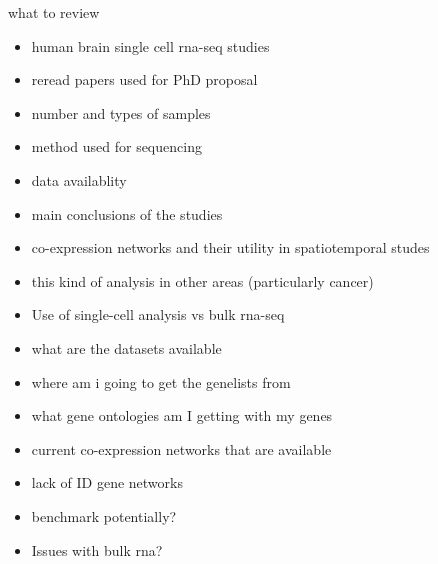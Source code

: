 \documentclass[12pt]{article}
\begin{document}
what to review

\begin{itemize}
	\item human brain single cell rna-seq studies 
	\item reread papers used for PhD proposal 
	\item number and types of samples 
	\item method used for sequencing 
	\item data availablity 
	\item main conclusions of the studies
	\item co-expression networks and their utility in spatiotemporal studes 
	\item this kind of analysis in other areas (particularly cancer)
	\item Use of single-cell analysis vs bulk rna-seq 
\end{itemize}


\begin{itemize}
	
	\item what are the datasets available 
	\item where am i going to get the genelists from 
	\item what gene ontologies am I getting with my genes 
	\item current co-expression networks that are available
	\item lack of ID gene networks 
	\item benchmark potentially?
	\item Issues with bulk rna? 
	
\end{itemize}
\end{document}

